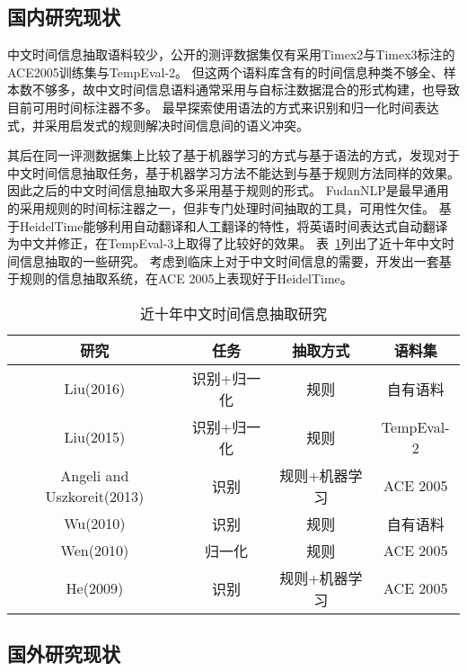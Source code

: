 \subsection{国内研究现状}

中文时间信息抽取语料较少，公开的测评数据集仅有采用Timex2与Timex3标注的ACE2005训练集与TempEval-2。
但这两个语料库含有的时间信息种类不够全、样本数不够多，故中文时间信息语料通常采用与自标注数据混合的形式构建，也导致目前可用时间标注器不多。
\citet{mingli2005ctemp}最早探索使用语法的方式来识别和归一化时间表达式，并采用启发式的规则解决时间信息间的语义冲突。

其后\citet{wu2005normalizing}在同一评测数据集上比较了基于机器学习的方式与基于语法的方式，发现对于中文时间信息抽取任务，基于机器学习方法不能达到与基于规则方法同样的效果。因此之后的中文时间信息抽取大多采用基于规则的形式。
FudanNLP\cite{qiu2013fudannlp}是最早通用的采用规则的时间标注器之一，但非专门处理时间抽取的工具，可用性欠佳。
\citet{li2014chinese}基于HeidelTime能够利用自动翻译和人工翻译的特性，将英语时间表达式自动翻译为中文并修正，在TempEval-3上取得了比较好的效果。
表~\ref{tab:research}列出了近十年中文时间信息抽取的一些研究。
\citet{liu2016cmedtex}考虑到临床上对于中文时间信息的需要，开发出一套基于规则的信息抽取系统，在ACE 2005上表现好于HeidelTime。

\begin{table}[h]
    \centering
    \caption{近十年中文时间信息抽取研究}
    \begin{tabular}{*{4}{c}}
        \toprule
        研究                       & 任务        & 抽取方式      & 语料集     \\
        \midrule
        Liu(2016)                  & 识别+归一化 & 规则          & 自有语料   \\
        Liu(2015)                  & 识别+归一化 & 规则          & TempEval-2 \\
        Angeli and Uszkoreit(2013) & 识别        & 规则+机器学习 & ACE 2005   \\
        Wu(2010)                   & 识别        & 规则          & 自有语料   \\
        Wen(2010)                  & 归一化      & 规则          & ACE 2005   \\
        He(2009)                   & 识别        & 规则+机器学习 & ACE 2005   \\
        \bottomrule
    \end{tabular}
    \label{tab:research}
\end{table}


\subsection{国外研究现状}


